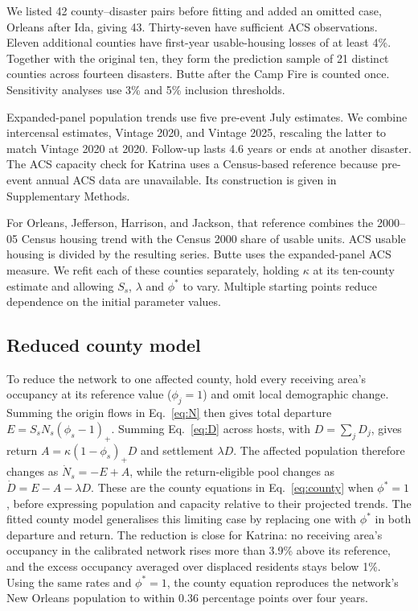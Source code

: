 \documentclass[11pt]{article}
\begin{document}
We listed 42 county--disaster pairs before fitting and added an omitted case, Orleans after Ida, giving 43. Thirty-seven have sufficient ACS observations. Eleven additional counties have first-year usable-housing losses of at least 4\%. Together with the original ten, they form the prediction sample of 21 distinct counties across fourteen disasters. Butte after the Camp Fire is counted once. Sensitivity analyses use 3\% and 5\% inclusion thresholds.

Expanded-panel population trends use five pre-event July estimates. We combine intercensal estimates, Vintage 2020, and Vintage 2025, rescaling the latter to match Vintage 2020 at 2020. Follow-up lasts 4.6 years or ends at another disaster. The ACS capacity check for Katrina uses a Census-based reference because pre-event annual ACS data are unavailable. Its construction is given in Supplementary Methods.

For Orleans, Jefferson, Harrison, and Jackson, that reference combines the 2000--05 Census housing trend with the Census 2000 share of usable units. ACS usable housing is divided by the resulting series. Butte uses the expanded-panel ACS measure. We refit each of these counties separately, holding $\kappa$ at its ten-county estimate and allowing $S_s$, $\lambda$ and $\phi^*$ to vary. Multiple starting points reduce dependence on the initial parameter values.

\subsection*{Reduced county model}



To reduce the network to one affected county, hold every receiving area's occupancy at its reference value ($\phi_j=1$) and omit local demographic change. Summing the origin flows in Eq.~\eqref{eq:N} then gives total departure $E=S_sN_s(\phi_s-1)_+$. Summing Eq.~\eqref{eq:D} across hosts, with $D=\sum_jD_j$, gives return $A=\kappa(1-\phi_s)_+D$ and settlement $\lambda D$. The affected population therefore changes as $\dot N_s=-E+A$, while the return-eligible pool changes as $\dot D=E-A-\lambda D$. These are the county equations in Eq.~\eqref{eq:county} when $\phi^*=1$, before expressing population and capacity relative to their projected trends. The fitted county model generalises this limiting case by replacing one with $\phi^*$ in both departure and return. The reduction is close for Katrina: no receiving area's occupancy in the calibrated network rises more than 3.9\% above its reference, and the excess occupancy averaged over displaced residents stays below 1\%. Using the same rates and $\phi^*=1$, the county equation reproduces the network's New Orleans population to within 0.36 percentage points over four years.
\end{document}
